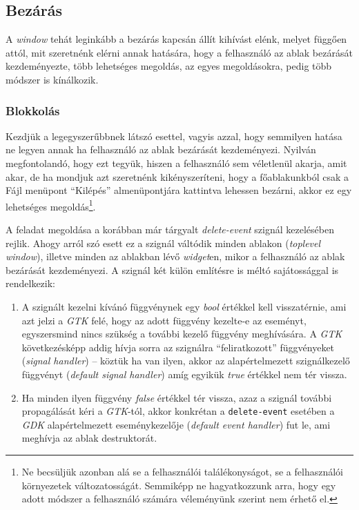 \subsection{Bezárás}

A \textit{window} tehát leginkább a bezárás kapcsán állít kihívást elénk, melyet függően attól, mit szeretnénk elérni annak hatására, hogy a felhasználó az ablak bezárását kezdeményezte, több lehetséges megoldás, az egyes megoldásokra, pedig több módszer is kínálkozik.

\subsubsection{Blokkolás}

Kezdjük a legegyszerűbbnek látszó esettel, vagyis azzal, hogy semmilyen hatása ne legyen annak ha felhasználó az ablak bezárását kezdeményezi. Nyilván megfontolandó, hogy ezt tegyük, hiszen a felhasználó sem véletlenül akarja, amit akar, de ha mondjuk azt szeretnénk kikényszeríteni, hogy a főablakunkból csak a Fájl menüpont ``Kilépés'' almenüpontjára kattintva lehessen bezárni, akkor ez egy lehetséges megoldás\footnote{Ne becsüljük azonban alá se a felhasználói találékonyságot, se a felhasználói környezetek változatosságát. Semmiképp ne hagyatkozzunk arra, hogy egy adott módszer a felhasználó számára véleményünk szerint nem érhető el.}.

A feladat megoldása a korábban már tárgyalt \textit{delete-event} szignál kezelésében rejlik. Ahogy arról szó esett ez a szignál váltódik minden ablakon (\textit{toplevel window}), illetve minden az ablakban lévő \textit{widget}en, mikor a felhasználó az ablak bezárását kezdeményezi. A szignál két külön említésre is méltó sajátossággal is rendelkezik:

\begin{enumerate}
 \item A szignált kezelni kívánó függvénynek egy \textit{bool} értékkel kell visszatérnie, ami azt jelzi a \textit{GTK} felé, hogy az adott függvény kezelte-e az eseményt, egyszersmind nincs szükség a további kezelő függvény meghívására. A \textit{GTK} következésképp addig hívja sorra az szignálra ``feliratkozott'' függvényeket (\textit{signal handler}) -- köztük ha van ilyen, akkor az alapértelmezett szignálkezelő függvényt (\textit{default signal handler}) amíg egyikük \textit{true} értékkel nem tér vissza.
 \item Ha minden ilyen függvény \textit{false} értékkel tér vissza, azaz a szignál további propagálását kéri a \textit{GTK}-tól, akkor konkrétan a \texttt{delete-event} esetében a \textit{GDK} alapértelmezett eseménykezelője (\textit{default event handler}) fut le, ami meghívja az ablak destruktorát.
\end{enumerate}

